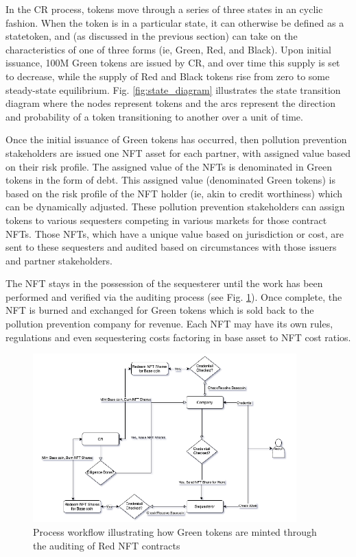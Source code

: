\documentclass{article}
\begin{document}
In the CR process, tokens move through a series of three states in an cyclic fashion. When the token is in a particular state, it can otherwise be defined as a statetoken, and (as discussed in the previous section) can take on the characteristics of one of three forms (ie, Green, Red, and Black). Upon initial issuance, 100M Green tokens are issued by CR, and over time this supply is set to decrease, while the supply of Red and Black tokens rise from zero to some steady-state equilibrium. Fig. \ref{fig:state_diagram} illustrates the state transition diagram where the nodes represent tokens and the arcs represent the direction and probability of a token transitioning to another over a unit of time.

Once the initial issuance of Green tokens has occurred, then pollution prevention stakeholders are issued one NFT asset for each partner, with assigned value based on their risk profile. The assigned value of the NFTs is denominated in Green tokens in the form of debt. This assigned value (denominated Green tokens) is based on the risk profile of the NFT holder (ie, akin to credit worthiness) which can be dynamically adjusted. These pollution prevention stakeholders can assign tokens to various sequesters competing in various markets for those contract NFTs. Those NFTs, which have a unique value based on jurisdiction or cost, are sent to these sequesters and audited based on circumstances with those issuers and partner stakeholders.

The NFT stays in the possession of the sequesterer until the work has been performed and verified via the auditing process (see Fig. \ref{fig:red_to_green}). Once complete, the NFT is burned and exchanged for Green tokens which is sold back to the pollution prevention company for revenue. Each NFT may have its own rules, regulations and even sequestering costs factoring in base asset to NFT cost ratios.

\begin{figure}[h]
\centering
\includegraphics[width=4in]{red_to_green.png}
\caption{Process workflow illustrating how Green tokens are minted through the auditing of Red NFT contracts } 
\label{fig:red_to_green}
\end{figure} 
\end{document}
